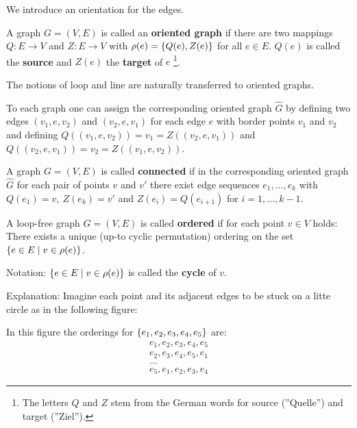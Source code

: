 We introduce an orientation for the edges. 

\bigskip
\begin{definition}
A graph $G = (V,E)$ is called an {\bf oriented graph} if there are two mappings
$Q : E \to V$ and $Z : E \to V$ with $\rho(e) = \mbox{$\{Q(e), Z(e)\}$}$ for all $e
\in E$.
$Q(e)$ is called the {\bf source} and $Z(e)$ the {\bf target} of $e$
\footnote{The letters $Q$ and $Z$ stem from the German words for source
(''Quelle'') and target (''Ziel'').}.
\end{definition}

The notions of loop and line are naturally transferred to oriented graphs.

To each graph one can assign the corresponding oriented graph $\hat{G}$ by
defining two edges $(v_1,e,v_2)$ and $(v_2,e,v_1)$ for each edge $e$ with
border points $v_1$ and $v_2$ and defining $Q((v_1,e,v_2)) = v_1 =
Z((v_2,e,v_1))$ and $Q((v_2,e,v_1)) = v_2 = Z((v_1,e,v_2))$.

\bigskip
\begin{definition}
A graph $G = (V,E)$ is called {\bf connected} if in the corresponding oriented
graph $\hat{G}$ for each pair of points $v$ and $v'$ there exist edge sequences
$e_1, \ldots, e_k$ with $Q(e_1) = v,\ Z(e_k) = v'$ and $Z(e_i) = Q(e_{i+1})$ for
$i = 1, \ldots, k-1$.
\end{definition}

\bigskip
\begin{definition}
A loop-free graph $G = (V,E)$ is called {\bf ordered} if for each point $v \in
V$ holds: There exists a unique (up-to cyclic permutation) ordering on the set
$\mbox{$\{e \in E \mid v \in \rho(e)\}$}$.
\end{definition}

Notation: $\mbox{$\{e \in E \mid v \in \rho(e)\}$}$ is called the {\bf cycle} of
$v$.

Explanation: Imagine each point and its adjacent edges to be stuck on a litte
circle as in the following figure:

\begin{center}

\end{center}

In this figure the orderings for $\mbox{$\{e_1,e_2,e_3,e_4,e_5\}$}$ are:
\begin{eqnarray*}
& e_1, e_2, e_3, e_4, e_5 \\
& e_2, e_3, e_4, e_5, e_1 \\
& \ldots & \\
& e_5, e_1, e_2, e_3, e_4
\end{eqnarray*}

